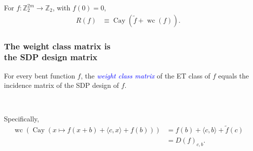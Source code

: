 \documentclass[pdf,sprung,slideColor,nocolorBG]{beamer}
\newenvironment{colortheme}[1]{
\def\ProvidesPackageRCS $##1${\relax}
\renewcommand{\ProcessOptions}{\relax}
\makeatletter

\makeatother
}{}
\newcommand{\mb}[1]{\mathbb{#1}}
\newcommand{\Emph}[1]{\emph{\textcolor{blue}{#1}}}
\newcommand{\To}{\rightarrow}
\newcommand{\Cay}[1]{\operatorname{Cay}\left(#1\right)}
\newcommand{\dual}[1]{\widetilde{#1}}
\newcommand{\weightclass}[1]{\operatorname{wc}\left(#1\right)}
\newcommand{\Z}{\mb{Z}}
\begin{document}
\begin{colortheme}{jubata}
\begin{frame}
\begin{Theorem}
For $f : \Z_2^{2m} \To \Z_2$, with $f(0)=0$,
\begin{align*}
R(f) &\equiv \Cay{\dual{f} + \weightclass{f}}.
\end{align*}
\end{Theorem}

\end{frame}
\begin{frame}
\frametitle{The weight class matrix is \\ the SDP design matrix}
\begin{Theorem}
For every bent function $f$, the \Emph{weight class matrix} of the ET class of $f$
equals the incidence matrix of the SDP design of $f$.

~

Specifically,
\begin{align*}
\weightclass{\Cay{x \mapsto f(x+b) + \langle c, x \rangle + f(b)}}
&=
f(b) + \langle c, b \rangle + \dual{f}(c)
\\
&=
D(f)_{c,b}.
\end{align*}

\end{Theorem}

\end{frame}
\end{colortheme}
\end{document}
